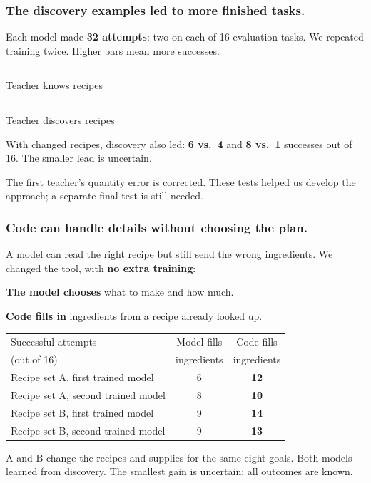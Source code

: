 \documentclass[aspectratio=169,12pt]{beamer}
\newcommand{\aside}[1]{\vfill{\footnotesize\color{Gray}#1\par}}
\begin{document}
\begin{frame}[t]
\frametitle{The discovery examples led to more finished tasks.}
Each model made \textbf{32 attempts}: two on each of 16 evaluation tasks. We repeated training twice. Higher bars mean more successes.
\vspace{1mm}
\begin{center}
\end{center}
{\small\color{Gray}\rule{4mm}{2mm} Teacher knows recipes\quad\color{Teal}\rule{4mm}{2mm} Teacher discovers recipes}
\medskip

With changed recipes, discovery also led: \textbf{6 vs.\ 4} and \textbf{8 vs.\ 1} successes out of 16. The smaller lead is uncertain.
\aside{The first teacher's quantity error is corrected. These tests helped us develop the approach; a separate final test is still needed.}
\end{frame}

\begin{frame}[t]
\frametitle{Code can handle details without choosing the plan.}
A model can read the right recipe but still send the wrong ingredients. We changed the tool, with \textbf{no extra training}:
\medskip

\textbf{The model chooses} what to make and how much.\par
\textbf{Code fills in} ingredients from a recipe already looked up.
\vspace{1mm}
\begin{center}
\renewcommand{\arraystretch}{1.05}
\begin{tabular}{lcc}
\toprule
Successful attempts & Model fills & Code fills\\
(out of 16) & ingredients & ingredients\\
\midrule
Recipe set A, first trained model & 6 & \textbf{12}\\
Recipe set A, second trained model & 8 & \textbf{10}\\
Recipe set B, first trained model & 9 & \textbf{14}\\
Recipe set B, second trained model & 9 & \textbf{13}\\
\bottomrule
\end{tabular}
\end{center}
\aside{A and B change the recipes and supplies for the same eight goals. Both models learned from discovery. The smallest gain is uncertain; all outcomes are known.}
\end{frame}
\end{document}
